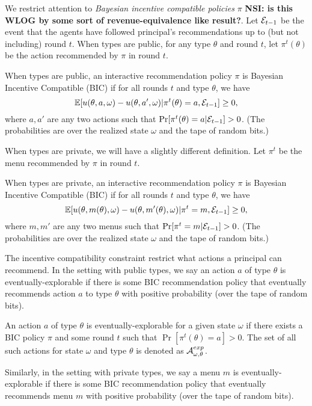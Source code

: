 We restrict attention to {\em Bayesian incentive compatible policies} $\pi$ {\bf NSI: is this WLOG by some sort of revenue-equivalence like result?}. Let $\mathcal{E}_{t-1}$ be the event that the agents have followed principal's recommendations up to (but not including) round $t$. When types are public, for any type $\theta$ and round $t$, let $\pi^t(\theta)$ be the action recommended by $\pi$ in round $t$.

\begin{definition}
When types are public, an interactive recommendation policy $\pi$ is Bayesian Incentive Compatible (BIC) if for all rounds $t$ and type $\theta$, we have
\[
\mathbb{E}[ u(\theta,a,\omega) - u(\theta,a',\omega)| \pi^t(\theta) =a, \mathcal{E}_{t-1}] \geq 0,
\]
where $a,a'$ are any two actions such that $\Pr[\pi^t(\theta) = a|\mathcal{E}_{t-1}] > 0$. (The probabilities are over the realized state $\omega$ and the tape of random bits.)
\end{definition}

When types are private, we will have a slightly different definition. Let $\pi^t$ be the menu recommended by $\pi$  in round $t$.

\begin{definition}
When types are private, an interactive recommendation policy $\pi$ is Bayesian Incentive Compatible (BIC) if for all rounds $t$ and type $\theta$, we have
\[
\mathbb{E}[ u(\theta,m(\theta),\omega) - u(\theta,m'(\theta),\omega)| \pi^t = m, \mathcal{E}_{t-1}] \geq 0,
\]
where $m,m'$ are any two menus such that $\Pr[\pi^t= m|\mathcal{E}_{t-1}] > 0$. (The probabilities are over the realized state $\omega$ and the tape of random bits.)
\end{definition}

The incentive compatibility constraint restrict what actions a principal can recommend.  In the setting with public types, we say an action $a$ of type $\theta$ is eventually-explorable if there is some BIC recommendation policy that eventually recommends action $a$ to type $\theta$ with positive probability (over the tape of random bits).

\begin{definition}
An action $a$ of type $\theta$ is eventually-explorable for a given state $\omega$ if there exists a BIC policy $\pi$ and some round $t$ such that $\Pr[\pi^t(\theta)=a]>0$.  The set of all such actions for state $\omega$ and type $\theta$ is denoted as $\mathcal{A}_{\omega,\theta}^{exp}$.
\end{definition}

Similarly, in the setting with private types, we say a menu $m$ is eventually-explorable if there is some BIC recommendation policy that eventually recommends menu $m$ with positive probability (over the tape of random bits).

